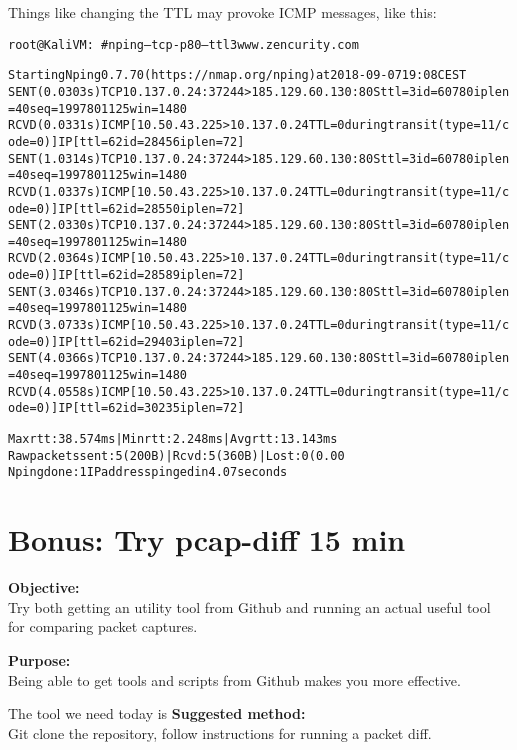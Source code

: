 \documentclass[a4paper,11pt,notitlepage]{report}
\begin{document}
\eject
Things like changing the TTL may provoke ICMP messages, like this:
\begin{alltt}\footnotesize
root@KaliVM:~# nping --tcp -p 80 --ttl 3 www.zencurity.com

Starting Nping 0.7.70 ( https://nmap.org/nping ) at 2018-09-07 19:08 CEST
SENT (0.0303s) TCP 10.137.0.24:37244 > 185.129.60.130:80 S ttl=3 id=60780 iplen=40  seq=1997801125 win=1480
RCVD (0.0331s) ICMP [10.50.43.225 > 10.137.0.24 TTL=0 during transit (type=11/code=0) ] IP [ttl=62 id=28456 iplen=72 ]
SENT (1.0314s) TCP 10.137.0.24:37244 > 185.129.60.130:80 S ttl=3 id=60780 iplen=40  seq=1997801125 win=1480
RCVD (1.0337s) ICMP [10.50.43.225 > 10.137.0.24 TTL=0 during transit (type=11/code=0) ] IP [ttl=62 id=28550 iplen=72 ]
SENT (2.0330s) TCP 10.137.0.24:37244 > 185.129.60.130:80 S ttl=3 id=60780 iplen=40  seq=1997801125 win=1480
RCVD (2.0364s) ICMP [10.50.43.225 > 10.137.0.24 TTL=0 during transit (type=11/code=0) ] IP [ttl=62 id=28589 iplen=72 ]
SENT (3.0346s) TCP 10.137.0.24:37244 > 185.129.60.130:80 S ttl=3 id=60780 iplen=40  seq=1997801125 win=1480
RCVD (3.0733s) ICMP [10.50.43.225 > 10.137.0.24 TTL=0 during transit (type=11/code=0) ] IP [ttl=62 id=29403 iplen=72 ]
SENT (4.0366s) TCP 10.137.0.24:37244 > 185.129.60.130:80 S ttl=3 id=60780 iplen=40  seq=1997801125 win=1480
RCVD (4.0558s) ICMP [10.50.43.225 > 10.137.0.24 TTL=0 during transit (type=11/code=0) ] IP [ttl=62 id=30235 iplen=72 ]

Max rtt: 38.574ms | Min rtt: 2.248ms | Avg rtt: 13.143ms
Raw packets sent: 5 (200B) | Rcvd: 5 (360B) | Lost: 0 (0.00%)
Nping done: 1 IP address pinged in 4.07 seconds
\end{alltt}


\chapter{Bonus: Try pcap-diff 15 min}
\label{ex:pcap-diff}

{\bf Objective:}\\
Try both getting an utility tool from Github and running an actual useful tool for comparing packet captures.

{\bf Purpose:}\\
Being able to get tools and scripts from Github makes you more effective.

The tool we need today is 
{\bf Suggested method:}\\
Git clone the repository, follow instructions for running a packet diff.
\end{document}
